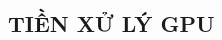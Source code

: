 \documentclass[a4paper]{article}
\newcommand{\gachdau}{\hspace*{1.5em}\ignorespaces}
\begin{document}

\newpage
    \begin{center}
        \section*{TIỀN XỬ LÝ GPU}
    \end{center}
\end{document}
